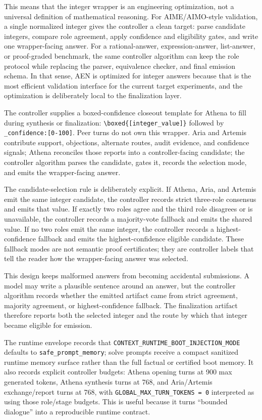 \documentclass[11pt]{article}
\newcommand{\athena}{Athena}
\newcommand{\aria}{Aria}
\newcommand{\artemis}{Artemis}
\begin{document}
This means that the integer wrapper is an engineering optimization, not a universal definition of mathematical reasoning. For AIME/AIMO-style validation, a single normalized integer gives the controller a clean target: parse candidate integers, compare role agreement, apply confidence and eligibility gates, and write one wrapper-facing answer. For a rational-answer, expression-answer, list-answer, or proof-graded benchmark, the same controller algorithm can keep the role protocol while replacing the parser, equivalence checker, and final emission schema. In that sense, AEN is optimized for integer answers because that is the most efficient validation interface for the current target experiments, and the optimization is deliberately local to the finalization layer.

The controller supplies a boxed-confidence closeout template for \athena{} to fill during synthesis or finalization: \texttt{\textbackslash boxed\{[integer\_value]\}} followed by \texttt{\_confidence:[0-100]}. Peer turns do not own this wrapper. \aria{} and \artemis{} contribute support, objections, alternate routes, audit evidence, and confidence signals; \athena{} reconciles those reports into a controller-facing candidate; the controller algorithm parses the candidate, gates it, records the selection mode, and emits the wrapper-facing answer.

The candidate-selection rule is deliberately explicit. If \athena{}, \aria{}, and \artemis{} emit the same integer candidate, the controller records strict three-role consensus and emits that value. If exactly two roles agree and the third role disagrees or is unavailable, the controller records a majority-vote fallback and emits the shared value. If no two roles emit the same integer, the controller records a highest-confidence fallback and emits the highest-confidence eligible candidate. These fallback modes are not semantic proof certificates; they are controller labels that tell the reader how the wrapper-facing answer was selected.

This design keeps malformed answers from becoming accidental submissions. A model may write a plausible sentence around an answer, but the controller algorithm records whether the emitted artifact came from strict agreement, majority agreement, or highest-confidence fallback. The finalization artifact therefore reports both the selected integer and the route by which that integer became eligible for emission.

The runtime envelope records that \texttt{CONTEXT\_RUNTIME\_BOOT\_INJECTION\_MODE} defaults to \texttt{safe\_prompt\_memory}; solve prompts receive a compact sanitized runtime memory surface rather than the full factual or certified boot memory. It also records explicit controller budgets: Athena opening turns at 900 max generated tokens, Athena synthesis turns at 768, and Aria/Artemis exchange/report turns at 768, with \texttt{GLOBAL\_MAX\_TURN\_TOKENS = 0} interpreted as using those role/stage budgets. This is useful because it turns ``bounded dialogue'' into a reproducible runtime contract.
\end{document}
